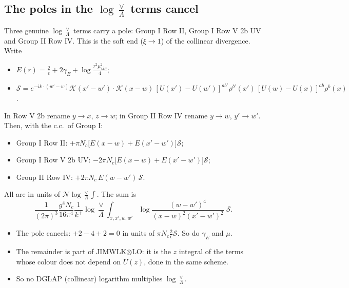 \documentclass[10pt]{article}
\numberwithin{equation}{section}
\newcommand{\NN}{\mathcal N\log\frac{\vee}{\Lambda}}
\begin{document}
\subsection{The poles in the $\log\frac{\vee}{\Lambda}$ terms cancel}
Three genuine $\log\frac{\vee}{\Lambda}$ terms carry a pole: Group I Row II, Group I Row V 2b UV and Group II Row IV. This is the soft end ($\xi\to1$) of the collinear divergence. Write
\begin{itemize}
\item $E(r)=\frac2\epsilon+2\gamma_E+\log\frac{r^2\mu^2_{\overline{MS}}}{4}$;
\item $\mathcal S=e^{-ik\cdot(w'-w)}\mathcal K(x'-w')\cdot\mathcal K(x-w)\,[U(x')-U(w')]^{ab'}\rho^{b'}(x')\,[U(w)-U(x)]^{ab}\rho^b(x)$.
\end{itemize}
In Row V 2b rename $y\to x$, $z\to w$; in Group II Row IV rename $y\to w$, $y'\to w'$. Then, with the c.c.\ of Group I:
\begin{itemize}
\item Group I Row II: $+\pi N_c\big[E(x-w)+E(x'-w')\big]\mathcal S$;
\item Group I Row V 2b UV: $-2\pi N_c\big[E(x-w)+E(x'-w')\big]\mathcal S$;
\item Group II Row IV: $+2\pi N_c\,E(w-w')\,\mathcal S$.
\end{itemize}
All are in units of $\NN\int$. The sum is
\begin{equation}
\frac{1}{(2\pi)^3}\frac{g^4N_c}{16\pi^4}\frac{1}{k^+}\log\frac{\vee}{\Lambda}\int_{x,x',w,w'}\log\frac{(w-w')^4}{(x-w)^2(x'-w')^2}\;\mathcal S .
\label{eq:polesum}
\end{equation}
\begin{itemize}
\item The pole cancels: $+2-4+2=0$ in units of $\pi N_c\frac{2}{\epsilon}\mathcal S$. So do $\gamma_E$ and $\mu$.
\item The remainder is part of JIMWLK$\otimes$LO: it is the $z$ integral of the terms whose colour does not depend on $U(z)$, done in the same scheme.
\item So no DGLAP (collinear) logarithm multiplies $\log\frac{\vee}{\Lambda}$.
\end{itemize}
\end{document}
